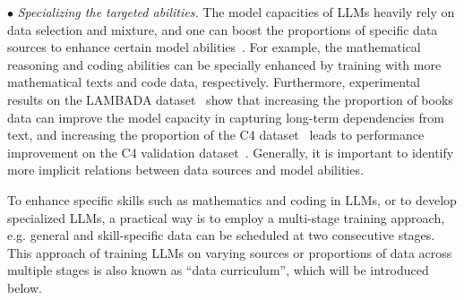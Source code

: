 $\bullet$ \emph{Specializing the targeted abilities.} The model capacities of LLMs heavily rely on data selection and mixture, and one can boost the proportions of specific data sources to enhance certain model abilities~\cite{Rae-arxiv-2021-Scaling,Longpre-arxiv-2023-pretrainer}. For example, the mathematical reasoning and coding abilities can be specially enhanced by training with more mathematical texts and code data, respectively. Furthermore, experimental results on the LAMBADA dataset~\cite{Paperno-ACL-2016-LAMBADA} show that increasing the proportion of books data can improve the model capacity  in capturing long-term dependencies from text, and increasing the proportion of the C4 dataset~\cite{Raffel-JMLR-2020-Exploring} leads to performance improvement on the C4 validation dataset~\cite{Rae-arxiv-2021-Scaling}. Generally, it is important to identify more implicit relations between data sources and  model abilities. { To enhance specific skills such as mathematics and coding in LLMs, or to develop specialized LLMs, a practical way is to employ a multi-stage training approach, e.g. general and skill-specific data can be  scheduled at two consecutive stages. This approach of training LLMs on varying sources or proportions of data across multiple stages is also known as ``data curriculum'', which will be introduced below.   

}
